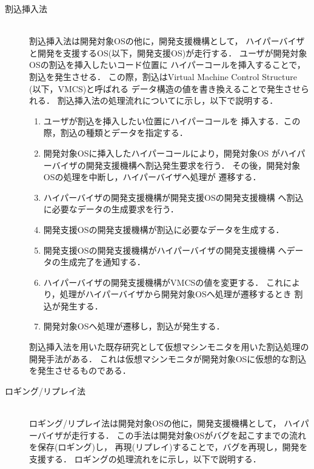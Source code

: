 \documentclass[submit,techreq,noauthor,dvipdfmx]{ipsj}
\begin{document}
\begin{description}
    \item[割込挿入法]\mbox{}\\
        割込挿入法は開発対象OSの他に，開発支援機構として，
        ハイパーバイザと開発を支援するOS(以下，開発支援OS)が走行する．
        ユーザが開発対象OSの割込を挿入したいコード位置に
        ハイパーコールを挿入することで，割込を発生させる．
        この際，割込はVirtual Machine Control Structure (以下，VMCS)と呼ばれる
        データ構造の値を書き換えることで発生させられる．
        割込挿入法の処理流れについてに示し，以下で説明する．
        \begin{enumerate}
            \item
                ユーザが割込を挿入したい位置にハイパーコールを
                挿入する．この際，割込の種類とデータを指定する．
            \item 
                開発対象OSに挿入したハイパーコールにより，開発対象OS
                がハイパーバイザの開発支援機構へ割込発生要求を行う．
                その後，開発対象OSの処理を中断し，ハイパーバイザへ処理が
                遷移する．
            \item 
                ハイパーバイザの開発支援機構が開発支援OSの開発支援機構
                へ割込に必要なデータの生成要求を行う．
            \item 
                開発支援OSの開発支援機構が割込に必要なデータを生成する．
            \item 
                開発支援OSの開発支援機構がハイパーバイザの開発支援機構
                へデータの生成完了を通知する．
            \item 
                ハイパーバイザの開発支援機構がVMCSの値を変更する．
                これにより，処理がハイパーバイザから開発対象OSへ処理が遷移するとき
                割込が発生する．
            \item 
                開発対象OSへ処理が遷移し，割込が発生する．
        \end{enumerate}

        割込挿入法を用いた既存研究として仮想マシンモニタを用いた割込処理の
        開発手法\cite{miyahara}がある．
        これは仮想マシンモニタが開発対象OSに仮想的な割込を発生させるものである．

    \item[ロギング/リプレイ法]\mbox{}\\
        ロギング/リプレイ法は開発対象OSの他に，開発支援機構として，
        ハイパーバイザが走行する．
        この手法は開発対象OSがバグを起こすまでの流れを保存(ロギング)し，
        再現(リプレイ)することで，バグを再現し，開発を支援する．
        ロギングの処理流れをに示し，以下で説明する．


\end{description}
\end{document}
